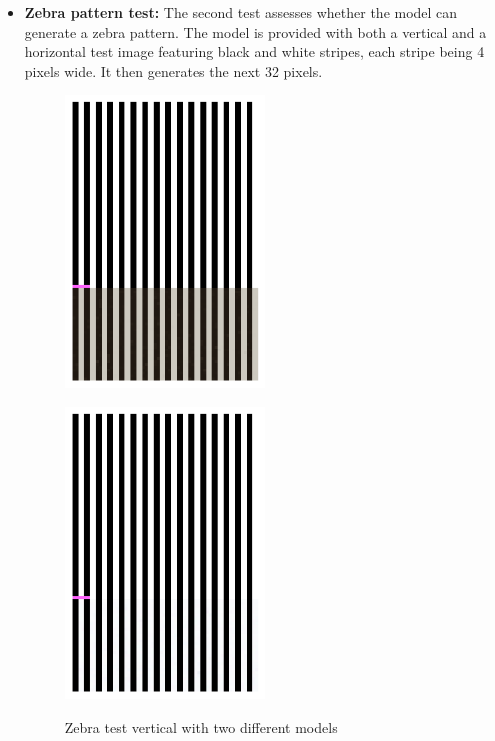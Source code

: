 \begin{itemize}
        \item \textbf{Zebra pattern test:} The second test assesses whether the model can generate a zebra pattern. The model is provided with both a vertical and a horizontal test image featuring black and white stripes, each stripe being 4 pixels wide. It then generates the next 32 pixels. 

        \begin{figure}[H]
            \centering
            \begin{minipage}{0.45\textwidth}
                \centering
                \includegraphics[width=0.5\textwidth]{imgs/ZebraTestV_2.1.7.1_OldData.png} 
                \label{fig:test2_0_M0_Cit}
            \end{minipage}
            \hfill
            \begin{minipage}{0.45\textwidth}
                \centering
                \includegraphics[width=0.5\textwidth]{imgs/ZebraTestV_2.1.8.1_512.png} 
                \label{fig:test2_0_M5_Cit}
            \end{minipage}
            \caption{Zebra test vertical with two different models}
        \end{figure}


\end{itemize}
